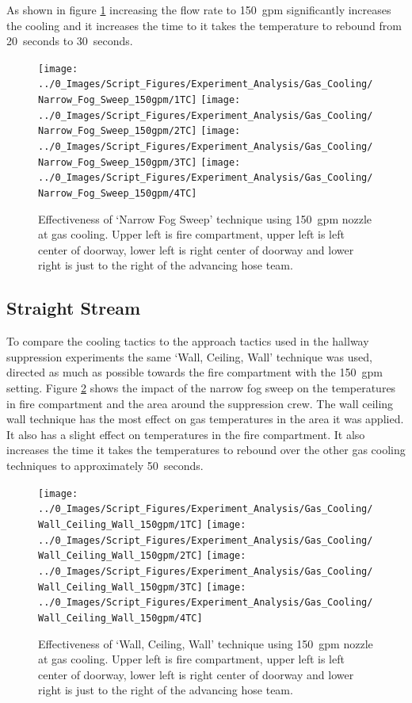 \documentclass[12pt,oneside]{book}
\begin{document}
As shown in figure \ref{fig:gas_narrow_fog_150} increasing the flow rate to 150~gpm significantly increases the cooling and it increases the time to it takes the temperature to rebound from 20~seconds to 30~seconds. 

\begin{figure}[H]
\centering
\texttt{[image: ../0\_Images/Script\_Figures/Experiment\_Analysis/Gas\_Cooling/Narrow\_Fog\_Sweep\_150gpm/1TC]}
\texttt{[image: ../0\_Images/Script\_Figures/Experiment\_Analysis/Gas\_Cooling/Narrow\_Fog\_Sweep\_150gpm/2TC]}
\texttt{[image: ../0\_Images/Script\_Figures/Experiment\_Analysis/Gas\_Cooling/Narrow\_Fog\_Sweep\_150gpm/3TC]}
\texttt{[image: ../0\_Images/Script\_Figures/Experiment\_Analysis/Gas\_Cooling/Narrow\_Fog\_Sweep\_150gpm/4TC]}
\caption[Gas Cooling - Narrow Fog Sweep 150~gpm]{Effectiveness of `Narrow Fog Sweep' technique using 150~gpm nozzle at gas cooling. Upper left is fire compartment, upper left is left center of doorway, lower left is right center of doorway and lower right is just to the right of the advancing hose team.}
\label{fig:gas_narrow_fog_150}
\end{figure}

\subsection{Straight Stream}
To compare the cooling tactics to the approach tactics used in the hallway suppression experiments the same `Wall, Ceiling, Wall' technique was used, directed as much as possible towards the fire compartment with the 150~gpm setting. Figure \ref{fig:gas_wall_ceiling_wall_150} shows the impact of the narrow fog sweep on the temperatures in fire compartment and the area around the suppression crew. The wall ceiling wall technique has the most effect on gas temperatures in the area it was applied. It also has a slight effect on temperatures in the fire compartment. It also increases the time it takes the temperatures to rebound over the other gas cooling techniques to approximately 50~seconds.

\begin{figure}[H]
\centering
\texttt{[image: ../0\_Images/Script\_Figures/Experiment\_Analysis/Gas\_Cooling/Wall\_Ceiling\_Wall\_150gpm/1TC]}
\texttt{[image: ../0\_Images/Script\_Figures/Experiment\_Analysis/Gas\_Cooling/Wall\_Ceiling\_Wall\_150gpm/2TC]}
\texttt{[image: ../0\_Images/Script\_Figures/Experiment\_Analysis/Gas\_Cooling/Wall\_Ceiling\_Wall\_150gpm/3TC]}
\texttt{[image: ../0\_Images/Script\_Figures/Experiment\_Analysis/Gas\_Cooling/Wall\_Ceiling\_Wall\_150gpm/4TC]}
\caption[Gas Cooling - Straight Stream 150~gpm]{Effectiveness of `Wall, Ceiling, Wall' technique using 150~gpm nozzle at gas cooling. Upper left is fire compartment, upper left is left center of doorway, lower left is right center of doorway and lower right is just to the right of the advancing hose team.}
\label{fig:gas_wall_ceiling_wall_150}
\end{figure}
\end{document}
